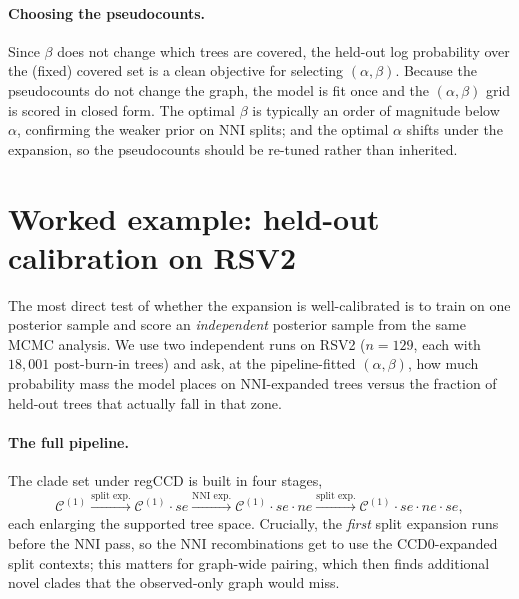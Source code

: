 \documentclass{article}
\newcommand{\CC}{\mathcal{C}}
\begin{document}
\paragraph{Choosing the pseudocounts.}
Since $\beta$ does not change which trees are covered, the held-out log
probability over the (fixed) covered set is a clean objective for selecting
$(\alpha,\beta)$. Because the pseudocounts do not change the graph, the model is
fit once and the $(\alpha,\beta)$ grid is scored in closed form. The optimal
$\beta$ is typically an order of magnitude below $\alpha$, confirming the weaker
prior on NNI splits; and the optimal $\alpha$ shifts under the expansion, so the
pseudocounts should be re-tuned rather than inherited.

\section*{Worked example: held-out calibration on RSV2}

The most direct test of whether the expansion is well-calibrated is to train on
one posterior sample and score an \emph{independent} posterior sample from the
same MCMC analysis. We use two independent runs on RSV2 ($n=129$, each with
$18{,}001$ post-burn-in trees) and ask, at the pipeline-fitted $(\alpha,\beta)$,
how much probability mass the model places on NNI-expanded trees versus the
fraction of held-out trees that actually fall in that zone.

\paragraph{The full pipeline.}
The clade set under regCCD is built in four stages,
\begin{equation}
  \CC^{(1)} \xrightarrow{\text{split exp.}} \CC^{(1)}\!\cdot se
  \xrightarrow{\text{NNI exp.}} \CC^{(1)}\!\cdot se\cdot ne
  \xrightarrow{\text{split exp.}} \CC^{(1)}\!\cdot se\cdot ne\cdot se ,
  \label{eq:pipeline}
\end{equation}
each enlarging the supported tree space. Crucially, the \emph{first} split
expansion runs before the NNI pass, so the NNI recombinations get to use the
CCD0-expanded split contexts; this matters for graph-wide pairing, which then
finds additional novel clades that the observed-only graph would miss.
\end{document}

